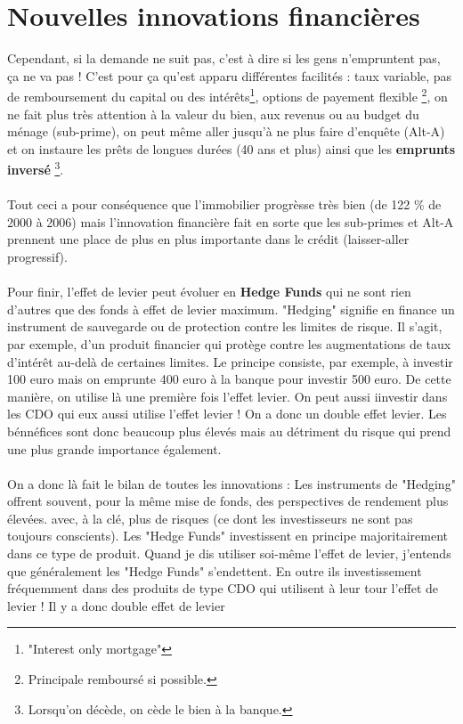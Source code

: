 \section{Nouvelles innovations financières}
Cependant, si la demande ne suit pas, c'est à dire si les gens n'empruntent pas, ça ne va pas ! C'est pour ça qu'est apparu différentes facilités : taux variable, pas de remboursement du capital ou des intérêts\footnote{"Interest only mortgage"}, options de payement flexible \footnote{Principale remboursé si possible.}, on ne fait plus très attention à la valeur du bien, aux revenus ou au budget du ménage (sub-prime), on peut même aller jusqu'à ne plus faire d'enquête (Alt-A) et on instaure les prêts de longues durées (40 ans et plus) ainsi que les \textbf{emprunts inversé} \footnote{Lorsqu'on décède, on cède le bien à la banque.}. 
\\\\
Tout ceci a pour conséquence que l'immobilier progrèsse très bien (de 122 \% de 2000 à 2006) mais l'innovation financière fait en sorte que les sub-primes et Alt-A prennent une place de plus en plus importante dans le crédit (laisser-aller progressif). 
\\\\
Pour finir, l'effet de levier peut évoluer en \textbf{Hedge Funds} qui ne sont rien d'autres que des fonds à effet de levier maximum. "Hedging" signifie en finance un instrument de sauvegarde ou de protection contre les limites de risque. Il s'agit, par exemple, d'un produit financier qui protège contre les augmentations de taux d'intérêt au-delà de certaines limites. Le principe consiste, par exemple, à investir 100 euro mais on emprunte 400 euro à la banque pour investir 500 euro. De cette manière, on utilise là une première fois l'effet levier. On peut aussi iinvestir dans les CDO qui eux aussi utilise l'effet levier ! On a donc un double effet levier. Les bénnéfices sont donc beaucoup plus élevés mais au détriment du risque qui prend une plus grande importance également. 
\\\\
On a donc là fait le bilan de toutes les innovations : 
Les instruments de "Hedging" offrent souvent, pour la même mise de fonds, des perspectives de rendement plus élevées. avec, à la clé, plus de risques (ce dont les investisseurs ne sont pas toujours conscients).
Les "Hedge Funds" investissent en principe majoritairement dans ce type de produit.
Quand je dis utiliser soi-même l'effet de levier, j'entends que généralement les "Hedge Funds" s'endettent. En outre ils investissement fréquemment dans des produits de type CDO qui utilisent à leur tour l'effet de levier ! Il y a donc double effet de levier
